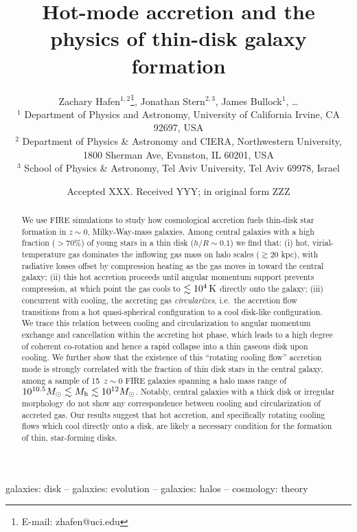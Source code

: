 \documentclass[fleqn,usenatbib]{mnras}
\title[Rotating cooling flows and thin galactic disks]{Hot-mode accretion and the physics of thin-disk galaxy formation}
\author[Hafen, Stern, Bullock et al.]{
Zachary Hafen$^{1,2}$\thanks{E-mail: zhafen@uci.edu},
Jonathan Stern$^{2,3}$,
James Bullock$^{1}$,
\ldots
\\
$^1$ Department of Physics and Astronomy, University of California Irvine, CA 92697, USA
\\
$^2$ Department of Physics \& Astronomy and CIERA, Northwestern University, 1800 Sherman Ave, Evanston, IL 60201, USA \\
$^3$ School of Physics \& Astronomy, Tel Aviv University, Tel Aviv 69978, Israel
}
\date{Accepted XXX. Received YYY; in original form ZZZ}
\newcommand{\Nsample}{15}
\begin{document}
\label{firstpage}
\pagerange{\pageref{firstpage}--\pageref{lastpage}}
\maketitle

\begin{abstract}
We use FIRE simulations to study how cosmological accretion fuels thin-disk star formation in $z\sim 0$, Milky-Way-mass galaxies.
Among central galaxies with a high fraction ($>70\%$) of young stars in a thin disk ($h/R \sim 0.1$) we find that:
(i) hot, virial-temperature gas dominates the inflowing gas mass on halo scales ($\gtrsim 20$ kpc), with radiative losses offset by compression heating as the gas moves in toward the central galaxy;
(ii) this hot accretion proceeds until angular momentum support prevents compression,  at which point the gas cools to $\lesssim10^4\,{\rm K}$ directly onto the galaxy; 
(iii) concurrent with cooling, the accreting gas \textit{circularizes}, i.e.\ the accretion flow transitions from a hot quasi-spherical configuration to a cool disk-like configuration.
We trace this relation between cooling and circularization to angular momentum exchange and cancellation within the accreting hot phase, which leads to a high degree of coherent co-rotation and hence a rapid collapse into a thin gaseous disk upon cooling.
We further show that the existence of this ``rotating cooling flow'' accretion mode is strongly correlated with the fraction of thin disk stars in the central galaxy, among a sample of \Nsample\ $z\sim0$ FIRE galaxies spanning a halo mass range of $10^{10.5} M_\odot \lesssim M_{\rm h} \lesssim 10^{12} M_\odot$.
Notably, central galaxies with a thick disk or irregular morphology do not show any correspondence between cooling and circularization of accreted gas. 
Our results suggest that hot accretion, and specifically rotating cooling flows which cool directly onto a disk, are likely a necessary condition for the formation of thin, star-forming disks.
\end{abstract}

\begin{keywords}
galaxies: disk -- galaxies: evolution -- galaxies: halos -- cosmology: theory
\end{keywords}


\end{document}

